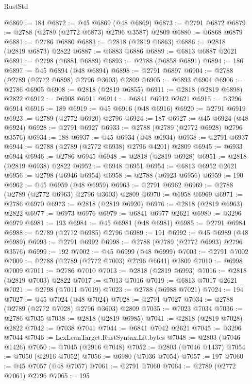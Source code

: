 \begin{lexlean}{RustStd}
\begin{coremodule}
@6869 := 184
@6872 := @45 @6869 (@48 @6869)
@6873 := @2791 @6872
@6879 := @2788 (@2789 (@2772 @6873) @2796 @3587) @2809
@6880 := @6868 @6879
@6881 := @2786 @6880
@6883 := @2818 (@2819 @6863)
@6886 := @2818 (@2819 @6873) @2822
@6887 := @6883 @6886
@6889 := @6813 @6887 @2621
@6891 := @2798 (@6881 @6889)
@6893 := @2788 (@6858 @6891)
@6894 := 186
@6897 := @45 @6894 (@48 @6894)
@6898 := @2791 @6897
@6904 := @2788 (@2789 (@2772 @6898) @2796 @3603) @2809
@6905 := @6893 @6904
@6906 := @2786 @6905
@6908 := @2818 (@2819 @6855)
@6911 := @2818 (@2819 @6898) @2822
@6912 := @6908 @6911
@6914 := @6841 @6912 @2621
@6915 := @3296 @6914
@6916 := 189
@6919 := @45 @6916 (@48 @6916)
@6920 := @2791 @6919
@6923 := @2789 (@2772 @6920) @2796
@6924 := 187
@6927 := @45 @6924 (@48 @6924)
@6928 := @2791 @6927
@6933 := @2788 (@2789 (@2772 @6928) @2796 @3576)
@6934 := 188
@6937 := @45 @6934 (@48 @6934)
@6938 := @2791 @6937
@6944 := @2788 (@2789 (@2772 @6938) @2796 @4201) @2809
@6945 := @6933 @6944
@6946 := @2786 @6945
@6948 := @2818 (@2819 @6928)
@6951 := @2818 (@2819 @6938) @2822
@6952 := @6948 @6951
@6954 := @6813 @6952 @2621
@6956 := @2798 (@6946 @6954)
@6958 := @2788 (@6923 @6956)
@6959 := 190
@6962 := @45 @6959 (@48 @6959)
@6963 := @2791 @6962
@6969 := @2788 (@2789 (@2772 @6963) @2796 @3603) @2809
@6970 := @6958 @6969
@6971 := @2786 @6970
@6973 := @2818 (@2819 @6920)
@6976 := @2818 (@2819 @6963) @2822
@6977 := @6973 @6976
@6979 := @6841 @6977 @2621
@6980 := @3296 @6979
@6981 := 193
@6984 := @45 @6981 (@48 @6981)
@6985 := @2791 @6984
@6988 := @2789 (@2772 @6985) @2796
@6989 := 191
@6992 := @45 @6989 (@48 @6989)
@6993 := @2791 @6992
@6998 := @2788 (@2789 (@2772 @6993) @2796 @3576)
@6999 := 192
@7002 := @45 @6999 (@48 @6999)
@7003 := @2791 @7002
@7009 := @2788 (@2789 (@2772 @7003) @2796 @6641) @2809
@7010 := @6998 @7009
@7011 := @2786 @7010
@7013 := @2818 (@2819 @6993)
@7016 := @2818 (@2819 @7003) @2822
@7017 := @7013 @7016
@7019 := @6813 @7017 @2621
@7021 := @2798 (@7011 @7019)
@7023 := @2788 (@6988 @7021)
@7024 := 194
@7027 := @45 @7024 (@48 @7024)
@7028 := @2791 @7027
@7034 := @2788 (@2789 (@2772 @7028) @2796 @3603) @2809
@7035 := @7023 @7034
@7036 := @2786 @7035
@7038 := @2818 (@2819 @6985)
@7041 := @2818 (@2819 @7028) @2822
@7042 := @7038 @7041
@7044 := @6841 @7042 @2621
@7045 := @3296 @7044
@7046 := LexLeanTarget.RustSyntax.Lit.bytes
@7048 := @2803 (@7046 @1426)
@7050 := @7045 (@2916 @7048)
@7052 := @2803 (@7046 @1437)
@7054 := @7050 (@2916 @7052)
@7056 := @6980 (@7036 @7054)
@7057 := 197
@7060 := @45 @7057 (@48 @7057)
@7061 := @2791 @7060
@7064 := @2789 (@2772 @7061) @2796
@7065 := 195

\end{coremodule}
\end{lexlean}
